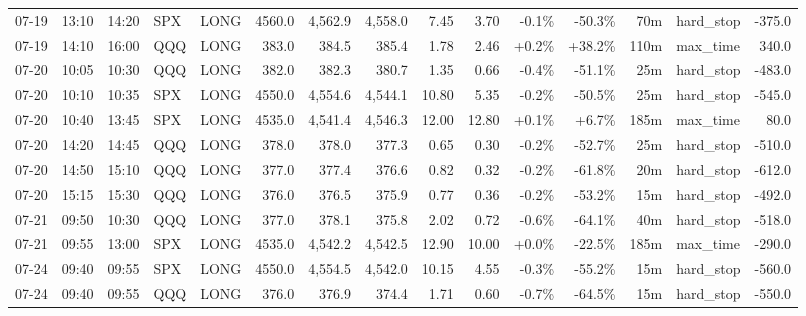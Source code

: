\documentclass[11pt,a4paper,twoside]{article}
\begin{document}
\begin{landscape}
\begin{center}
\begin{longtable}{>{\color{txtmain}}l l l l l r r r r r r r r >{\color{txtmain}}l r}
07-19 & 13:10 & 14:20 & SPX & LONG & 4560.0 & 4,562.9 & 4,558.0 & 7.45 & 3.70 & \textcolor{lossred}{-0.1\%} & \textcolor{lossred}{-50.3\%} & 70m & hard\_stop & \textcolor{lossred}{-375.0} \\
07-19 & 14:10 & 16:00 & QQQ & LONG & 383.0 & 384.5 & 385.4 & 1.78 & 2.46 & \textcolor{wingreen}{+0.2\%} & \textcolor{wingreen}{+38.2\%} & 110m & max\_time & \textcolor{wingreen}{340.0} \\
07-20 & 10:05 & 10:30 & QQQ & LONG & 382.0 & 382.3 & 380.7 & 1.35 & 0.66 & \textcolor{lossred}{-0.4\%} & \textcolor{lossred}{-51.1\%} & 25m & hard\_stop & \textcolor{lossred}{-483.0} \\
07-20 & 10:10 & 10:35 & SPX & LONG & 4550.0 & 4,554.6 & 4,544.1 & 10.80 & 5.35 & \textcolor{lossred}{-0.2\%} & \textcolor{lossred}{-50.5\%} & 25m & hard\_stop & \textcolor{lossred}{-545.0} \\
07-20 & 10:40 & 13:45 & SPX & LONG & 4535.0 & 4,541.4 & 4,546.3 & 12.00 & 12.80 & \textcolor{wingreen}{+0.1\%} & \textcolor{wingreen}{+6.7\%} & 185m & max\_time & \textcolor{wingreen}{80.0} \\
07-20 & 14:20 & 14:45 & QQQ & LONG & 378.0 & 378.0 & 377.3 & 0.65 & 0.30 & \textcolor{lossred}{-0.2\%} & \textcolor{lossred}{-52.7\%} & 25m & hard\_stop & \textcolor{lossred}{-510.0} \\
07-20 & 14:50 & 15:10 & QQQ & LONG & 377.0 & 377.4 & 376.6 & 0.82 & 0.32 & \textcolor{lossred}{-0.2\%} & \textcolor{lossred}{-61.8\%} & 20m & hard\_stop & \textcolor{lossred}{-612.0} \\
07-20 & 15:15 & 15:30 & QQQ & LONG & 376.0 & 376.5 & 375.9 & 0.77 & 0.36 & \textcolor{lossred}{-0.2\%} & \textcolor{lossred}{-53.2\%} & 15m & hard\_stop & \textcolor{lossred}{-492.0} \\
07-21 & 09:50 & 10:30 & QQQ & LONG & 377.0 & 378.1 & 375.8 & 2.02 & 0.72 & \textcolor{lossred}{-0.6\%} & \textcolor{lossred}{-64.1\%} & 40m & hard\_stop & \textcolor{lossred}{-518.0} \\
07-21 & 09:55 & 13:00 & SPX & LONG & 4535.0 & 4,542.2 & 4,542.5 & 12.90 & 10.00 & \textcolor{wingreen}{+0.0\%} & \textcolor{lossred}{-22.5\%} & 185m & max\_time & \textcolor{lossred}{-290.0} \\
07-24 & 09:40 & 09:55 & SPX & LONG & 4550.0 & 4,554.5 & 4,542.0 & 10.15 & 4.55 & \textcolor{lossred}{-0.3\%} & \textcolor{lossred}{-55.2\%} & 15m & hard\_stop & \textcolor{lossred}{-560.0} \\
07-24 & 09:40 & 09:55 & QQQ & LONG & 376.0 & 376.9 & 374.4 & 1.71 & 0.60 & \textcolor{lossred}{-0.7\%} & \textcolor{lossred}{-64.5\%} & 15m & hard\_stop & \textcolor{lossred}{-550.0} \\

\end{longtable}
\end{center}
\end{landscape}
\end{document}
